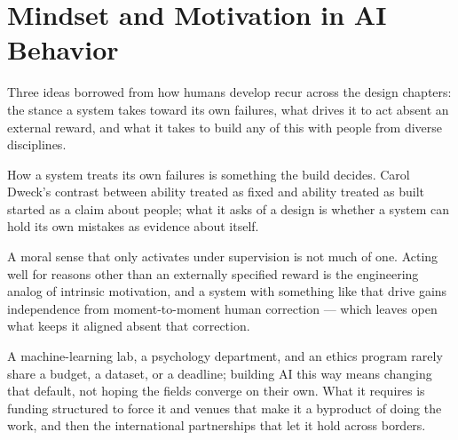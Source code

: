 \section{Mindset and Motivation in AI Behavior}
\label{sec:1.3}
Three ideas borrowed from how humans develop recur across the design chapters: the stance a system takes toward its own failures, what drives it to act absent an external reward, and what it takes to build any of this with people from diverse disciplines.

How a system treats its own failures is something the build decides. Carol Dweck's contrast between ability treated as fixed and ability treated as built started as a claim about people; what it asks of a design is whether a system can hold its own mistakes as evidence about itself.

A moral sense that only activates under supervision is not much of one. Acting well for reasons other than an externally specified reward is the engineering analog of intrinsic motivation, and a system with something like that drive gains independence from moment-to-moment human correction — which leaves open what keeps it aligned absent that correction.

A machine-learning lab, a psychology department, and an ethics program rarely share a budget, a dataset, or a deadline; building AI this way means changing that default, not hoping the fields converge on their own. What it requires is funding structured to force it and venues that make it a byproduct of doing the work, and then the international partnerships that let it hold across borders.
